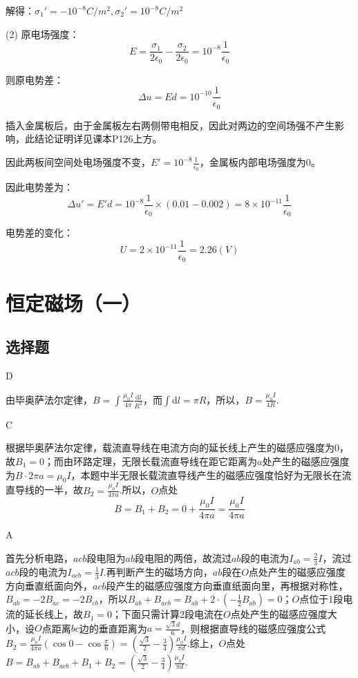 \documentclass[b5paper,opensource,sourcefont,parskip]{qyxf-book}
\newcommand{\di}[1]{\mathrm{d}#1}
\begin{document}
解得：$\sigma_1'=-10^{-8}C/m^2,\sigma_2'=10^{-8}C/m^2$

(2) 原电场强度：
\[E=\frac{\sigma_1}{2\epsilon_0}-\frac{\sigma_2}{2\epsilon_0}=10^{-8}\frac{1}{\epsilon_0}\]

则原电势差：
\[\Delta u=Ed=10^{-10}\frac{1}{\epsilon_0}\]

插入金属板后，由于金属板左右两侧带电相反，因此对两边的空间场强不产生影响，此结论证明详见课本P126上方。

因此两板间空间处电场强度不变，$ E'=10^{-8}\frac{1}{\epsilon_0} $，金属板内部电场强度为$ 0 $。

因此电势差为：
\[\Delta u'=E'd=10^{-8}\frac{1}{\epsilon_0}\times(0.01-0.002)=8\times 10^{-11}\frac{1}{\epsilon_0}\]

电势差的变化：
\[U=2\times10^{-11}\frac{1}{\epsilon_0}=2.26(V)\]

\chapter{恒定磁场（一）}  %
\section{选择题}  %

D  %

\solve
由毕奥萨法尔定律，$B=\int\frac{\mu_0I}{4\pi}\frac{\di l}{R^2}$，而$\int\di l=\pi R$，所以，$B=\frac{\mu_0I}{4R}$.

C

\solve
根据毕奥萨法尔定律，载流直导线在电流方向的延长线上产生的磁感应强度为0，故$B_1=0$；而由环路定理，无限长载流直导线在距它距离为$a$处产生的磁感应强度为$B\cdot2\pi a=\mu_0I$，本题中半无限长载流直导线产生的磁感应强度恰好为无限长在流直导线的一半，故$B_2=\frac{\mu_0I}{4\pi a}$.所以，$O$点处
\begin{equation*}
B=B_1+B_2=0+\frac{\mu_0I}{4\pi a}=\frac{\mu_0I}{4\pi a}
\end{equation*}

A

\solve
首先分析电路，$acb$段电阻为$ab$段电阻的两倍，故流过$ab$段的电流为$I_{ab}=\frac{2}{3}I$，流过$acb$段的电流为$I_{acb}=\frac{1}{3}I$.再判断产生的磁场方向，$ab$段在$O$点处产生的磁感应强度方向垂直纸面向外，$acb$段产生的磁感应强度方向垂直纸面向里，再根据对称性，$B_{ab}=-2B_{ac}=-2B_{cb}$，所以$B_{ab}+B_{acb}=B_{ab}+2\cdot(-\frac{1}{2}B_{ab})=0$；$O$点位于1段电流的延长线上，故$B_1=0$；下面只需计算2段电流在$O$点处产生的磁感应强度大小，设$O$点距离$bc$边的垂直距离为$a=\frac{\sqrt{3}d}{6}$，则根据直导线的磁感应强度公式$B_2=\frac{\mu_0I}{4\pi a}(\cos 0-\cos\frac{\pi}{6})=(\frac{\sqrt{3}}{2}-\frac{3}{4})\frac{\mu_0I}{\pi d}$.综上，$O$点处$B=B_{ab}+B_{acb}+B_1+B_2=(\frac{\sqrt{3}}{2}-\frac{3}{4})\frac{\mu_0I}{\pi d}$.
\end{document}
